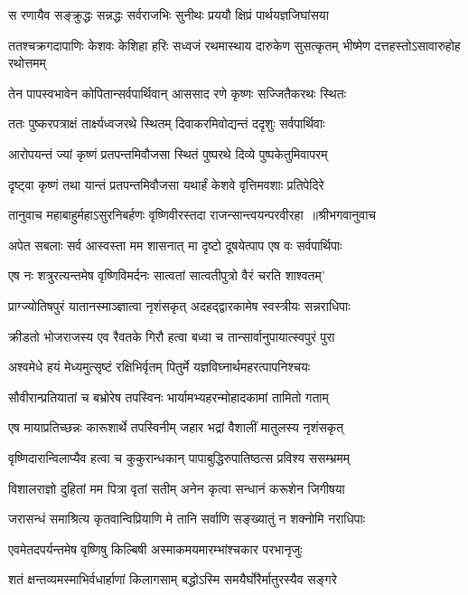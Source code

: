 \twolineshloka
{स रणायैव सङ्क्रुद्धः सन्नद्धः सर्वराजभिः}
{सुनीथः प्रययौ क्षिप्रं पार्थयज्ञजिघांसया}


\threelineshloka
{ततश्चक्रगदापाणिः केशवः केशिहा हरिः}
{सध्वजं रथमास्थाय दारुकेण सुसत्कृतम्}
{भीष्मेण दत्तहस्तोऽसावारुहोह रथोत्तमम्}


\twolineshloka
{तेन पापस्वभावेन कोपितान्सर्वपार्थिवान्}
{आससाद रणे कृष्णः सज्जितैकरथः स्थितः}


\twolineshloka
{ततः पुष्करपत्राक्षं तार्क्ष्यध्वजरथे स्थितम्}
{दिवाकरमिवोद्यन्तं ददृशुः सर्वपार्थिवाः}


\twolineshloka
{आरोपयन्तं ज्यां कृष्णं प्रतपन्तमिवौजसा}
{स्थितं पुष्परथे दिव्ये पुष्पकेतुमिवापरम्}


\twolineshloka
{दृष्ट्वा कृष्णं तथा यान्तं प्रतपन्तमिवौजसा}
{यथार्हं केशवे वृत्तिमवशाः प्रतिपेदिरे}


\twolineshloka
{तानुवाच महाबाहुर्महाऽसुरनिबर्हणः}
{वृष्णिवीरस्तदा राजन्सान्त्वयन्परवीरहा ॥श्रीभगवानुवाच}


\twolineshloka
{अपेत सबलाः सर्व आस्वस्ता मम शासनात्}
{मा दृष्टो दूषयेत्पाप एष वः सर्वपार्थिपाः}


\twolineshloka
{एष नः शत्रुरत्यन्तमेष वृष्णिविमर्दनः}
{सात्वतां सात्वतीपुत्रो वैरं चरति शाश्वतम्'}


\twolineshloka
{प्राग्ज्योतिषपुरं यातानस्माञ्ज्ञात्वा नृशंसकृत्}
{अदहद्द्वारकामेष स्वस्त्रीयः सन्नराधिपाः}


\twolineshloka
{क्रीडतो भोजराजस्य एव रैवतके गिरौ}
{हत्वा बध्वा च तान्सार्वानुपायात्स्वपुरं पुरा}


\twolineshloka
{अश्वमेधे हयं मेध्यमुत्सृष्टं रक्षिभिर्वृतम्}
{पितुर्मे यज्ञविघ्नार्थमहरत्पापनिश्चयः}


\twolineshloka
{सौवीरान्प्रतियातां च बभ्रोरेष तपस्विनः}
{भार्यामभ्यहरन्मोहादकामां तामितो गताम्}


\twolineshloka
{एष मायाप्रतिच्छन्नः कारूशार्थे तपस्विनीम्}
{जहार भद्रां वैशालीं मातुलस्य नृशंसकृत्}


\twolineshloka
{वृष्णिदारान्विलाप्यैव हत्वा च कुकुरान्धकान्}
{पापाबुद्धिरुपातिष्ठत्स प्रविश्य ससम्भ्रमम्}


\twolineshloka
{विशालराज्ञो दुहितां मम पित्रा वृतां सतीम्}
{अनेन कृत्वा सन्धानं करूशेन जिगीषया}


\twolineshloka
{जरासन्धं समाश्रित्य कृतवान्विप्रियाणि मे}
{तानि सर्वाणि सङ्ख्यातुं न शक्नोमि नराधिपाः}


\twolineshloka
{एवमेतदपर्यन्तमेष वृष्णिषु किल्बिषी}
{अस्माकमयमारम्भांश्चकार परभानृजुः}


\twolineshloka
{शतं क्षन्तव्यमस्माभिर्वधार्हाणां किलागसाम्}
{बद्धोऽस्मि समयैर्घोरैर्मातुरस्यैव सङ्गरे}


